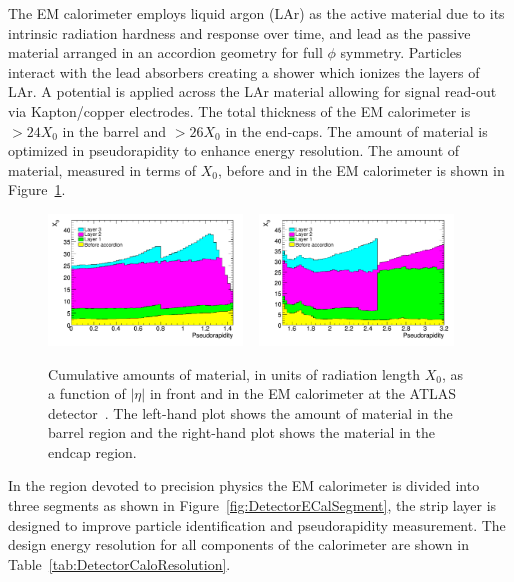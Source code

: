 The EM calorimeter employs liquid argon (LAr) as the active material due to its intrinsic radiation hardness and response over time, and lead as the passive material arranged in an accordion geometry for full $\phi$ symmetry. Particles interact with the lead absorbers creating a shower which ionizes the layers of LAr. A potential is applied across the LAr material allowing for signal read-out via Kapton/copper electrodes. The total thickness of the EM calorimeter is $>24X_{0}$ in the barrel and $>26X_{0}$ in the end-caps. The amount of material is optimized in pseudorapidity to enhance energy resolution. The amount of material, measured in terms of $X_{0}$, before and in the EM calorimeter is shown in Figure~\ref{fig:DetectorInteraction}.

\begin{figure}[htbp]
  \centering
  \includegraphics[width=0.46\textwidth]{PartDetector/Plots/x0_layers_barrel_csc03.pdf}
  ~
  \includegraphics[width=0.46\textwidth]{PartDetector/Plots/x0_layers_endcap_csc03.pdf}
  \caption[Cumulative amounts of material, in units of radiation length $X_{0}$, as a function of $|\eta|$ in front and in the EM calorimeter at the ATLAS detector.]{Cumulative amounts of material, in units of radiation length $X_{0}$, as a function of $|\eta|$ in front and in the EM calorimeter at the ATLAS detector~\cite{Detector:ExpectedPerf}. The left-hand plot shows the amount of material in the barrel region and the right-hand plot shows the material in the endcap region.}
  \label{fig:DetectorInteraction}
\end{figure}

In the region devoted to precision physics the EM calorimeter is divided into three segments as shown in Figure~\ref{fig:DetectorECalSegment}, the strip layer is designed to improve particle identification and pseudorapidity measurement. The design energy resolution for all components of the calorimeter are shown in Table~\ref{tab:DetectorCaloResolution}.

